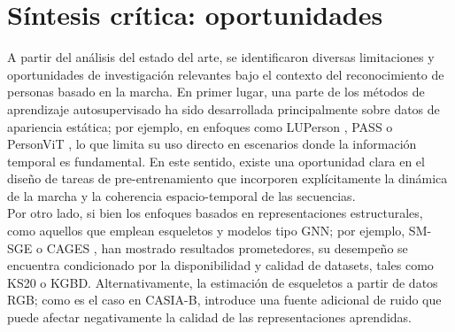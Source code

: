 \section{Síntesis crítica: oportunidades}

A partir del análisis del estado del arte, se identificaron diversas limitaciones y oportunidades de investigación relevantes bajo el contexto del reconocimiento de personas basado en la marcha. En primer lugar, una parte de los métodos de aprendizaje autosupervisado ha sido desarrollada principalmente sobre datos de apariencia estática; por ejemplo, en enfoques como LUPerson \cite{Zheng2022GaitLU1M}, PASS \cite{Zheng2022PASS} o PersonViT \cite{Huang2025PersonViT}, lo que limita su uso directo en escenarios donde la información temporal es fundamental. En este sentido, existe una oportunidad clara en el diseño de tareas de pre-entrenamiento que incorporen explícitamente la dinámica de la marcha y la coherencia espacio-temporal de las secuencias. \\
Por otro lado, si bien los enfoques basados en representaciones estructurales, como aquellos que emplean esqueletos y modelos tipo GNN; por ejemplo, SM-SGE \cite{Han2021SMSGE} o CAGES \cite{Han2021LocalitySGE}, han mostrado resultados prometedores, su desempeño se encuentra condicionado por la disponibilidad y calidad de datasets, tales como KS20 o KGBD. Alternativamente, la estimación de esqueletos a partir de datos RGB; como es el caso en CASIA-B, introduce una fuente adicional de ruido que puede afectar negativamente la calidad de las representaciones aprendidas.

